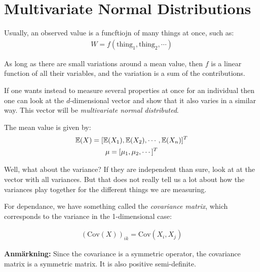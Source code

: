 \section{Multivariate Normal Distributions}\par
Usually, an observed value is a funcftiojn of many things at once, such as:
\begin{equation*}
  \begin{gathered}
    W = f(\text{thing}_1, \text{thing}_2, \cdots)
  \end{gathered}
\end{equation*}
\par\bigskip
\noindent As long as there are small variations around a mean value, then $f$  is a linear function of all their variables, and the variation is a sum of the contributions.
\par\bigskip
\noindent If one wants instead to measure several properties at once for an individual then one can look at the $d$-dimensional vector and show that it also varies in a similar way. This vector will be \textit{multivariate normal distributed}.
\par\bigskip
\noindent The mean value is given by:
\begin{equation*}
  \begin{gathered}
    \mathbb{E}(X) = [\mathbb{E}(X_1), \mathbb{E}(X_2), \cdots, \mathbb{E}(X_n)]^T\\
    \mu = [\mu_1,\mu_2,\cdots]^T
  \end{gathered}
\end{equation*}
\par\bigskip
\noindent Well, what about the variance? If they are independent than sure, look at at the vector with all variances. But that does not really tell us a lot about how the variances play together for the different things we are measuring.\par
\noindent For dependance, we have something called the \textit{covariance matrix}, which corresponds to the variance in the 1-dimensional case:\par
\begin{equation*}
  \begin{gathered}
    (\text{Cov}\left(X\right))_{ik} = \text{Cov}\left(X_i,X_j\right)
  \end{gathered}
\end{equation*}
\par\bigskip
\noindent\textbf{Anmärkning:} Since the covariance is a symmetric operator, the covariance matrix is a symmetric matrix. It is also positive semi-definite.
